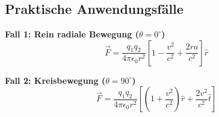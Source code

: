 \subsection{Praktische Anwendungsfälle}

\textbf{Fall 1: Rein radiale Bewegung ($\theta = 0^\circ$)}
\begin{equation}
\vec{F} = \frac{q_1 q_2}{4\pi\epsilon_0 r^2}\left[1 - \frac{v^2}{c^2} + \frac{2r a}{c^2}\right]\hat{r}
\end{equation}

\textbf{Fall 2: Kreisbewegung ($\theta = 90^\circ$)}
\begin{equation}
\vec{F} = \frac{q_1 q_2}{4\pi\epsilon_0 r^2}\left[\left(1 + \frac{v^2}{c^2}\right)\hat{r} + \frac{2v^2}{c^2}\hat{t}\right]
\end{equation}
